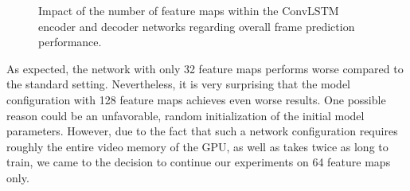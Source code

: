 \begin{figure}[htb]
\begin{subfigure}{0.5\textwidth}
{
  }
  \caption{}
  \label{fig:plot-mm-filter-bce}
\end{subfigure}%
\begin{subfigure}{0.5\textwidth}
  \centering
  \modelA
  \modelB
  \modelC
  \hspace*{-0.6cm}
  {
  }
  \caption{}
  \label{fig:plot-mm-filter-psnr}
\end{subfigure}
\caption[Influences of ConvLSTM Feature Maps]{Impact of the number of feature maps within the ConvLSTM encoder and decoder networks regarding overall frame prediction performance.} \label{fig:plot-mm-filter}
\end{figure}

As expected, the network with only 32 feature maps performs worse compared to the standard setting. Nevertheless, it is very surprising that the model configuration with 128 feature maps achieves even worse results. One possible reason could be an unfavorable, random initialization of the initial model parameters. However, due to the fact that such a network configuration requires roughly the entire video memory of the GPU, as well as takes twice as long to train, we came to the decision to continue our experiments on 64 feature maps only.


